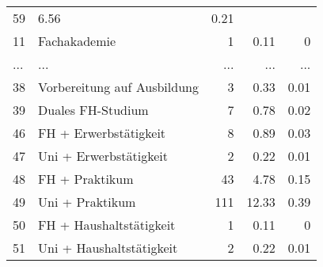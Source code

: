 \begin{longtable}{lXrrr}
          \num{59} &
          \num[round-mode=places,round-precision=2]{6,56} &
          \num[round-mode=places,round-precision=2]{0,21} \\
        11 & \multicolumn{1}{X}{Fachakademie} & %
          \num{1} &
          \num[round-mode=places,round-precision=2]{0,11} &
          \num[round-mode=places,round-precision=2]{0} \\
       ... & ... & ... & ... & ... \\
        38 & \multicolumn{1}{X}{Vorbereitung auf Ausbildung} & %
          \num{3} &
          \num[round-mode=places,round-precision=2]{0,33} &
          \num[round-mode=places,round-precision=2]{0,01} \\

        39 & \multicolumn{1}{X}{Duales FH-Studium} & %
          \num{7} &
          \num[round-mode=places,round-precision=2]{0,78} &
          \num[round-mode=places,round-precision=2]{0,02} \\

        46 & \multicolumn{1}{X}{FH + Erwerbstätigkeit} & %
          \num{8} &
          \num[round-mode=places,round-precision=2]{0,89} &
          \num[round-mode=places,round-precision=2]{0,03} \\

        47 & \multicolumn{1}{X}{Uni + Erwerbstätigkeit} & %
          \num{2} &
          \num[round-mode=places,round-precision=2]{0,22} &
          \num[round-mode=places,round-precision=2]{0,01} \\

        48 & \multicolumn{1}{X}{FH + Praktikum} & %
          \num{43} &
          \num[round-mode=places,round-precision=2]{4,78} &
          \num[round-mode=places,round-precision=2]{0,15} \\

        49 & \multicolumn{1}{X}{Uni + Praktikum} & %
          \num{111} &
          \num[round-mode=places,round-precision=2]{12,33} &
          \num[round-mode=places,round-precision=2]{0,39} \\

        50 & \multicolumn{1}{X}{FH + Haushaltstätigkeit} & %
          \num{1} &
          \num[round-mode=places,round-precision=2]{0,11} &
          \num[round-mode=places,round-precision=2]{0} \\

        51 & \multicolumn{1}{X}{Uni + Haushaltstätigkeit} & %
          \num{2} &
          \num[round-mode=places,round-precision=2]{0,22} &
          \num[round-mode=places,round-precision=2]{0,01} \\


\end{longtable}
